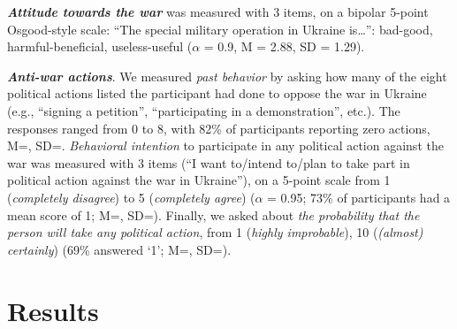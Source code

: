 \documentclass[
]{article}
\begin{document}
\textbf{\emph{Attitude towards the war}} was measured with 3 items, on a bipolar 5-point Osgood-style scale: ``The special military operation in Ukraine is\ldots{}'': bad-good, harmful-beneficial, useless-useful (\(\alpha\) = 0.9, M = 2.88, SD = 1.29).

\textbf{\emph{Anti-war actions}}. We measured \emph{past behavior} by asking how many of the eight political actions listed the participant had done to oppose the war in Ukraine (e.g., ``signing a petition'', ``participating in a demonstration'', etc.). The responses ranged from 0 to 8, with 82\% of participants reporting zero actions, M=, SD=. \emph{Behavioral intention} to participate in any political action against the war was measured with 3 items (``I want to/intend to/plan to take part in political action against the war in Ukraine''), on a 5-point scale from 1 (\emph{completely disagree}) to 5 (\emph{completely agree}) (\(\alpha\) = 0.95; 73\% of participants had a mean score of 1; M=, SD=). Finally, we asked about \emph{the probability that the person will take any political action}, from 1 (\emph{highly improbable}), 10 (\emph{(almost) certainly}) (69\% answered `1'; M=, SD=).

\allsectionsfont{\centering}

\section*{Results}\label{results}
\end{document}
